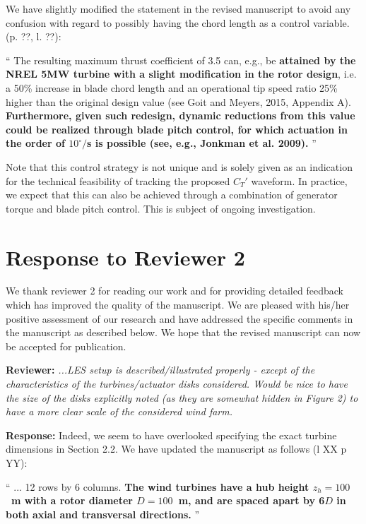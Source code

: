 \documentclass[]{article}
\begin{document}
We have slightly modified the statement in the revised manuscript to avoid any confusion with regard to possibly having the chord length as a control variable. (p. ??, l. ??):

``
The resulting maximum thrust coefficient of 3.5 can, e.g., be \textbf{attained by the NREL 5MW turbine with a slight modification in the rotor design}, i.e. a 50\% increase in blade chord length and an operational tip speed ratio 25\% higher than 
the original design value (see Goit and Meyers, 2015, Appendix A). \textbf{Furthermore, given such redesign, dynamic reductions from this value could be realized through blade pitch control, for which actuation in the order of $10^\circ/$s is possible (see, e.g., Jonkman et al. 2009).} 
''

Note that this control strategy is not unique and is solely given as an indication for the technical feasibility of tracking the proposed $C_T'$ waveform. In practice, we expect that this can also be achieved through a combination of generator torque and blade pitch control. This is subject of ongoing investigation.


\clearpage
\section*{Response to Reviewer 2}
We thank reviewer 2 for reading our work and for providing detailed feedback which has improved the quality of the manuscript. We are pleased with his/her positive assessment of our research and have addressed the specific comments in the manuscript as described below. We hope that the revised manuscript can now be accepted for publication. 

\dotfill

\textbf{Reviewer: } \textit{...LES setup is described/illustrated properly - except of the characteristics of the turbines/actuator disks considered. Would be nice to have the size of the disks explicitly noted (as they are somewhat hidden in Figure 2) to have a more clear scale of the considered wind farm.}

\textbf{Response: } Indeed, we seem to have overlooked specifying the exact turbine dimensions in Section 2.2. We have updated the manuscript as follows (l XX p YY): 

``
... 12 rows by 6 columns. \textbf{The wind turbines have a hub height $z_h = 100$~m with a rotor diameter $D = 100$~m, and are spaced apart by 6$D$ in both axial and transversal directions.}
''

\dotfill
\end{document}
